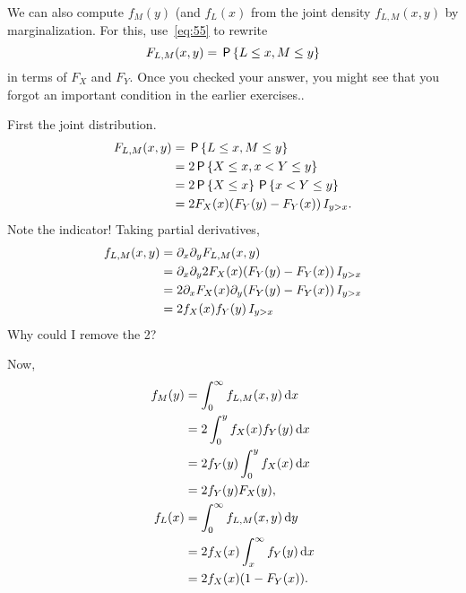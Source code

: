 \documentclass[a4paper,12pt]{article}
\begin{document}
\begin{exercise}
We can also compute $f_{M}(y)$ (and $f_{L}(x)$ from the joint density $f_{L,M}(x,y)$ by marginalization. For this, use~\cref{eq:55} to rewrite 
\begin{equation*}
  F_{L,M}(x,y) = \P{L\leq x, M\leq y}
\end{equation*}
in terms of $F_X$ and $F_Y$.
Once you checked your answer, you might see that you forgot an important condition in the earlier exercises..
\begin{solution}
First the joint distribution.
  \begin{align}
    \label{eq:51}
F_{L,M}(x,y) &= \P{L\leq x, M \leq y} \\
&= 2\P{X \leq x, x < Y \leq y} \\
&= 2\P{X \leq x} \P{x < Y \leq y} \\
&= 2 F_{X}(x) (F_Y(y)-F_Y(x)) \1{y>x}.
  \end{align}
Note the indicator! 
Taking partial derivatives,
\begin{align}
  \label{eq:52}
f_{L,M}(x,y) 
&=\partial_x\partial_{y}F_{L,M}(x,y) \\  
&=\partial_x\partial_{y}2 F_{X}(x) (F_Y(y)-F_Y(x)) \1{y>x}\\
&=2 \partial_x F_{X}(x) \partial_{y} (F_Y(y)-F_Y(x)) \1 {y>x} \\
&= 2f_X(x) f_Y(y)\1{y>x} \\ 
\end{align}
Why could I remove the 2?

Now,
\begin{align}
  \label{eq:54}
  f_M(y) &=  \int_0^{\infty} f_{L,M}(x,y) \d x \\
&= 2 \int_0^{y} f_{X}(x) f_Y(y) \d x \\
&= 2 f_Y(y) \int_0^{y} f_{X}(x) \d x  \\
&= 2f_Y(y) F_X(y), \\
f_L(x) &=  \int_0^{\infty} f_{L,M}(x,y) \d y \\
&= 2 f_{X}(x) \int_x^{\infty} f_Y(y) \d x \\
&= 2 f_{X}(x) (1-F_Y(x)).
\end{align}



\end{solution}
\end{exercise}
\end{document}
